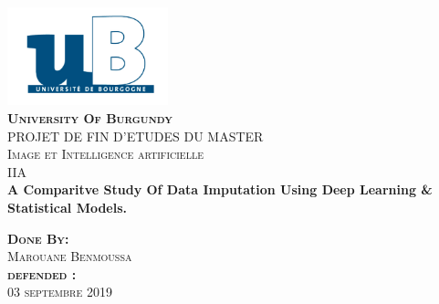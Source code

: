 \begin{titlepage}
\begin{center}


\includegraphics[width=0.35\textwidth]{img/logoUniv}~\\[1cm]

\textsc{\LARGE \bfseries University Of Burgundy }\\[1.1cm]


\textsc{\Large PROJET DE FIN D’ETUDES DU MASTER}\\[0.3cm]

\textsc{\Large Image et Intelligence artificielle }\\[0.2cm]

\textsc{\Large  IIA }\\[0.2cm]

{\huge \bfseries A Comparitve Study Of Data Imputation Using Deep Learning \& Statistical Models.\\[0.1cm] }


\textsc{\Large \bfseries Done By:}\\%
\textsc{\large Marouane Benmoussa}\\[0.2cm]

\textsc{\Large \bfseries defended :}\\%
\textsc{\large 03 septembre 2019}\\[0.1cm]

%


\end{center}
\end{titlepage}
